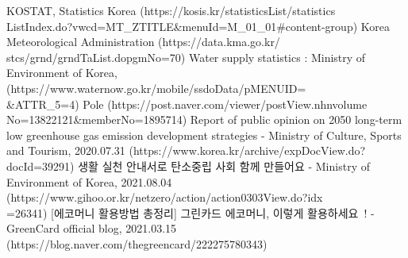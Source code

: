 \documentclass[11pt, conference]{IEEEtran}
\begin{document}
\begin{thebibliography}{00}

 KOSTAT, Statistics Korea (https://kosis.kr/statisticsList/statistics\\ListIndex.do?vwcd=MT\_ZTITLE\&menuId=M\_01\_01\#content-group)
 Korea Meteorological Administration (https://data.kma.go.kr/\\stcs/grnd/grndTaList.do\?pgmNo=70)
 Water supply statistics : Ministry of Environment of Korea, (https://www.waternow.go.kr/mobile/ssdoData/\?pMENUID=\\\8\&ATTR\_5=4)
 Pole (https://post.naver.com/viewer/postView.nhn\?volume\\No=13822121\&memberNo=1895714)
 Report of public opinion on 2050 long-term low greenhouse gas emission development strategies - Ministry of Culture, Sports and Tourism, 2020.07.31 (https://www.korea.kr/archive/expDocView.do?docId=39291)
 생활 실천 안내서로 탄소중립 사회 함께 만들어요 - Ministry of Environment of Korea, 2021.08.04 (https://www.gihoo.or.kr/netzero/action/action0303View.do?idx\\=26341)
 [에코머니 활용방법 총정리] 그린카드 에코머니, 이렇게 활용하세요~! - GreenCard official blog, 2021.03.15
(https://blog.naver.com/thegreencard/222275780343)
\end{thebibliography}
\end{document}
